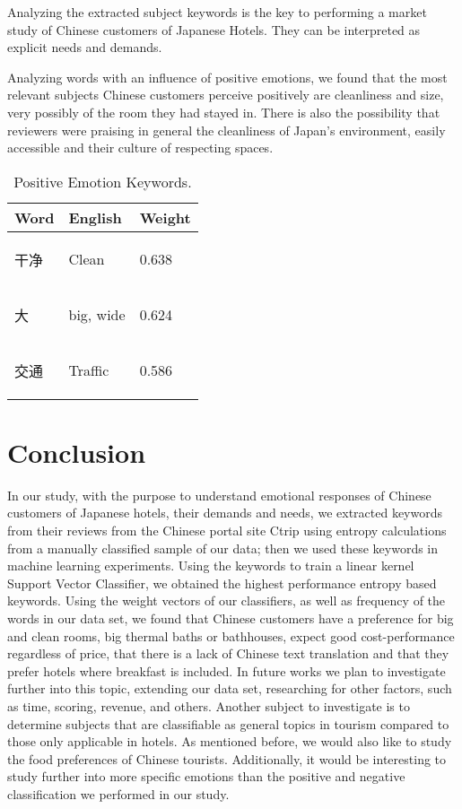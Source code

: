 \documentclass[review]{elsarticle}
\begin{document}
Analyzing the extracted subject keywords is the key to performing a market study of Chinese customers of Japanese Hotels. They can be interpreted as explicit needs and demands. 

Analyzing words with an influence of positive emotions, we found that the most relevant subjects Chinese customers perceive positively are cleanliness and size, very possibly of the room they had stayed in. There is also the possibility that reviewers were praising in general the cleanliness of Japan’s environment, easily accessible and their culture of respecting spaces.

\begin{table}[]
\centering
\caption{Positive Emotion Keywords.}
\label{tab:2}
\begin{tabular}{|l|l|l|}
\hline
Word & English & Weight \\ \hline 
\begin{CJK}{UTF8}{gbsn} 干净 \end{CJK} & Clean & 0.638 \\ \hline
\begin{CJK}{UTF8}{gbsn} 大 \end{CJK} & big, wide & 0.624 \\ \hline
\begin{CJK}{UTF8}{gbsn} 交通 \end{CJK}  & Traffic & 0.586 \\ \hline
\end{tabular}
\end{table}

\section{Conclusion}

In our study, with the purpose to understand emotional responses of Chinese customers of Japanese hotels, their demands and needs, we extracted keywords from their reviews from the Chinese portal site Ctrip using entropy calculations from a manually classified sample of our data; then we used these keywords in machine learning experiments. Using the keywords to train a linear kernel Support Vector Classifier, we obtained the highest performance entropy based keywords.
Using the weight vectors of our classifiers, as well as frequency of the words in our data set, we found that Chinese customers have a preference for big and clean rooms, big thermal baths or bathhouses, expect good cost-performance regardless of price, that there is a lack of Chinese text translation and that they prefer hotels where breakfast is included. 
In future works we plan to investigate further into this topic, extending our data set, researching for other factors, such as time, scoring, revenue, and others. Another subject to investigate is to determine subjects that are classifiable as general topics in tourism compared to those only applicable in hotels. As mentioned before, we would also like to study the food preferences of Chinese tourists. Additionally, it would be interesting to study further into more specific emotions than the positive and negative classification we performed in our study.
\end{document}
